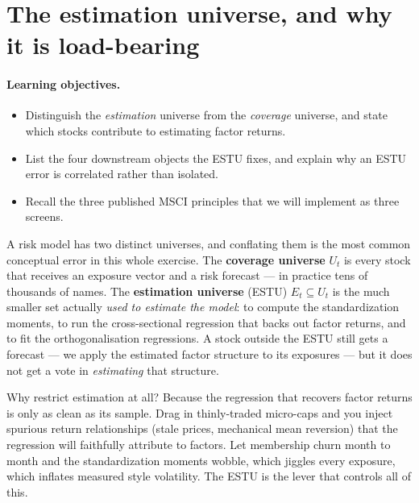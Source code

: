 \documentclass[11pt]{article}
\theoremstyle{definition}
\theoremstyle{plain}
\theoremstyle{remark}
\begin{document}
\tableofcontents
\bigskip

\section{The estimation universe, and why it is load-bearing}\label{sec:why}

\paragraph{Learning objectives.}
\begin{itemize}[nosep,leftmargin=1.4em]
  \item Distinguish the \emph{estimation} universe from the \emph{coverage} universe, and state which stocks contribute to estimating factor returns.
  \item List the four downstream objects the ESTU fixes, and explain why an ESTU error is correlated rather than isolated.
  \item Recall the three published MSCI principles that we will implement as three screens.
\end{itemize}

A risk model has two distinct universes, and conflating them is the most common conceptual error in this whole exercise. The \textbf{coverage universe} $U_t$ is every stock that receives an exposure vector and a risk forecast --- in practice tens of thousands of names. The \textbf{estimation universe} (ESTU) $E_t \subseteq U_t$ is the much smaller set actually \emph{used to estimate the model}: to compute the standardization moments, to run the cross-sectional regression that backs out factor returns, and to fit the orthogonalisation regressions. A stock outside the ESTU still gets a forecast --- we apply the estimated factor structure to its exposures --- but it does not get a vote in \emph{estimating} that structure.

Why restrict estimation at all? Because the regression that recovers factor returns is only as clean as its sample. Drag in thinly-traded micro-caps and you inject spurious return relationships (stale prices, mechanical mean reversion) that the regression will faithfully attribute to factors. Let membership churn month to month and the standardization moments wobble, which jiggles every exposure, which inflates measured style volatility. The ESTU is the lever that controls all of this.
\end{document}
